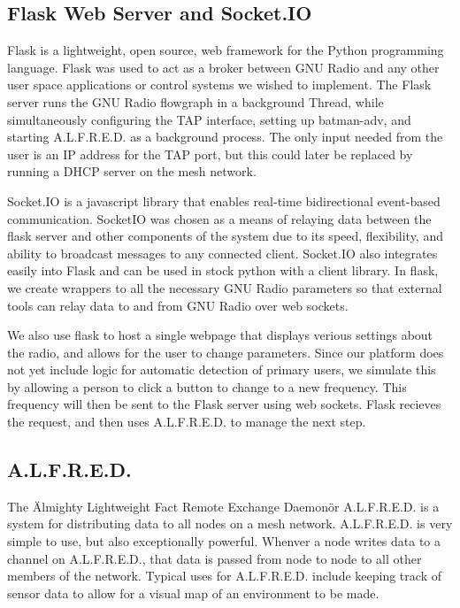 \subsection{Flask Web Server and Socket.IO}

Flask is a lightweight, open source, web framework for the Python programming language. Flask was used to act as a broker between GNU Radio and any other user space applications or control systems we wished to implement. The Flask server runs the GNU Radio flowgraph in a background Thread, while simultaneously configuring the TAP interface, setting up batman-adv, and starting A.L.F.R.E.D. as a background process. The only input needed from the user is an IP address for the TAP port, but this could later be replaced by running a DHCP server on the mesh network. 

Socket.IO is a javascript library that enables real-time bidirectional event-based communication.  SocketIO was chosen as a means of relaying data between the flask server and other components of the system due to its speed, flexibility, and ability to broadcast messages to any connected client. Socket.IO also integrates easily into Flask and can be used in stock python with a client library. In flask, we create wrappers to all the necessary GNU Radio parameters so that external tools can relay data to and from GNU Radio over web sockets.  

We also use flask to host a single webpage that displays verious settings about the radio, and allows for the user to change parameters. Since our platform does not yet include logic for automatic detection of primary users, we simulate this by allowing a person to click a button to change to a new frequency. This frequency will then be sent to the Flask server using web sockets. Flask recieves the request, and then uses A.L.F.R.E.D. to manage the next step. 

\subsection{A.L.F.R.E.D.}

 The \"Almighty Lightweight Fact Remote Exchange Daemon\" or A.L.F.R.E.D. is a system for distributing data to all nodes on a mesh network. A.L.F.R.E.D. is very simple to use, but also exceptionally powerful. Whenver a node writes data to a channel on A.L.F.R.E.D., that data is passed from node to node to all other members of the network. Typical uses for A.L.F.R.E.D. include keeping track of sensor data to allow for a visual map of an environment to be made. 

